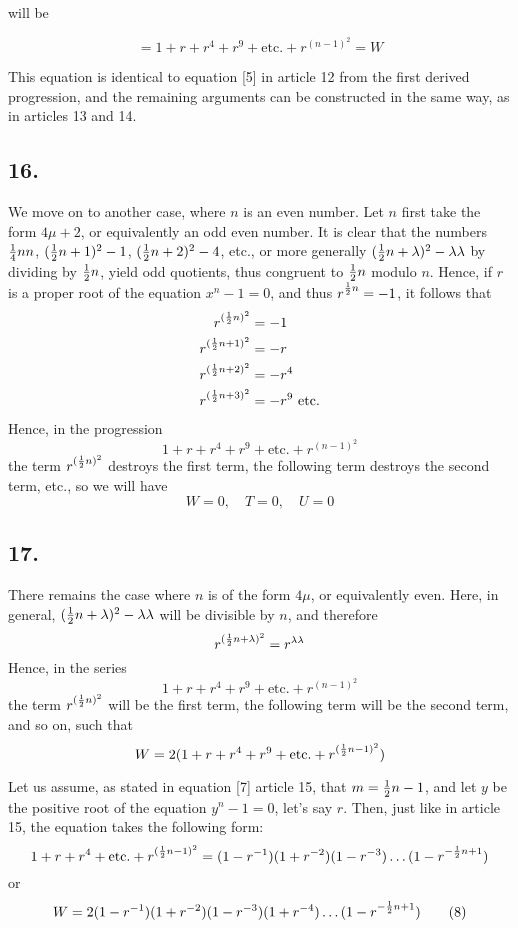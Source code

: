 \documentclass[twoside,12pt, showframe]{memoir}
\let\oldfrac\frac
\def\frac#1#2{\mathchoice{\tfrac{#1}{#2}}{\oldfrac{#1}{#2}}{\genfrac{}{}{}{2}{#1}{#2\mathstrut}}{\genfrac{}{}{}{3}{#1}{#2\mathstrut}}}
\begin{document}
will be
  
\[=1+r+r^{4}+r^{9}+\text{etc.}+r^{(n-1)^{2}}=W\]

This equation is identical to equation [5] in article 12 from the first derived progression, and the remaining arguments can be constructed in the same way, as in articles 13 and 14.
%

\subsection*{16.}

We move on to another case, where \(n\) is an even number. Let \(n\) first take the form \(4 \mu+2\), or equivalently an odd even number. It is clear that the numbers \(\frac{1}{4} n n\), \((\frac{1}{2} n+1)^{2}-1\), \((\frac{1}{2} n+2)^{2}-4\), etc., or more generally \((\frac{1}{2} n+\lambda)^{2}-\lambda \lambda\) by dividing by \(\frac{1}{2} n\), yield odd quotients, thus congruent to \(\frac{1}{2} n\) modulo \(n\). Hence, if \(r\) is a proper root of the equation \(x^{n}-1=0\), and thus \(r^{\frac{1}{2} n}=-1\), it follows that
\[\begin{aligned}
r^{(\frac{1}{2} n)^{2}} & =-1 \\
r^{(\frac{1}{2} n+1)^{2}} & =-r \\
r^{(\frac{1}{2} n+2)^2} & =-r^{4} \\
r^{(\frac{1}{2} n+3)^{2}} & =-r^{9} \text{ etc.}
\end{aligned}\]
Hence, in the progression
\[1+r+r^{4}+r^{9}+\text{etc.}+r^{(n-1)^{2}}\]
the term \(r^{(\frac{1}{2} n)^{2}}\) destroys the first term, the following term destroys the second term, etc., so we will have
\[W=0, \quad T=0, \quad U=0\]
%

\subsection*{17.}

There remains the case where \(n\) is of the form \(4 \mu\), or equivalently even. Here, in general, \((\frac{1}{2} n+\lambda)^{2}-\lambda \lambda\) will be divisible by \(n\), and therefore
\[r^{(\frac{1}{2} n+\lambda)^{2}}=r^{\lambda \lambda}\]
Hence, in the series
\[1+r+r^{4}+r^{9}+\text{etc.}+r^{(n-1)^{2}}\]
the term \(r^{(\frac{1}{2} n)^{2}}\) will be the first term, the following term will be the second term, and so on, such that
\[W=2(1+r+r^{4}+r^{9}+\text{etc.}+r^{(\frac{1}{2} n-1)^{2}})\]
%

Let us assume, as stated in equation [7] article 15, that \(m=\frac{1}{2} n-1\), and let \(y\) be the positive root of the equation \(y^{n}-1=0\), let's say \(r\). Then, just like in article 15, the equation takes the following form:
\[1+r+r^{4}+\text{etc.}+r^{(\frac{1}{2} n-1)^{2}}=(1-r^{-1})(1+r^{-2})(1-r^{-3}) \ldots(1-r^{-\frac{1}{2} n+1})\]\clearpage\noindent%
or
\[W=2(1-r^{-1})(1+r^{-2})(1-r^{-3})(1+r^{-4}) \ldots(1-r^{-\frac{1}{2} n+1}) \tag{8}\]
%
\end{document}
